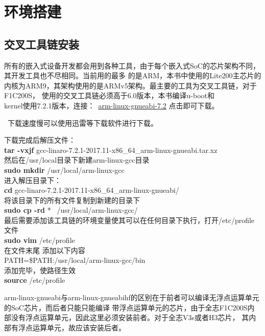 \section{环境搭建}
\subsection{交叉工具链安装}
所有的嵌入式设备开发都会用到各种工具，由于每个嵌入式SoC的芯片架构不同，其开发工具也不尽相同。当前用的最多
的是ARM，本书中使用的Lite200主芯片的内核为ARM9，其架构使用的是ARMv5架构。最主要的工具为交叉工具链，对于F1C200S，
使用的交叉工具链必须高于6.0版本，本书编译u-boot和\\
kernel使用7.2.1版本，连接：\faChain \ 
\href{https://releases.linaro.org/components/toolchain/binaries/7.2-2017.11/arm-linux-gnueabi/gcc-linaro-7.2.1-2017.11-x86_64_arm-linux-gnueabi.tar.xz}{arm-linux-gnueabi-7.2}
\quad 点击即可下载。
\begin{tcolorbox}[colback=red!5!white,colframe=red!75!black]
	\faBellO \ 下载速度慢可以使用迅雷等下载软件进行下载。
\end{tcolorbox}
\noindent
下载完成后解压文件：\\
\textbf{tar -vxjf } gcc-linaro-7.2.1-2017.11-x86\_64\_arm-linux-gnueabi.tar.xz \\
然后在/usr/local目录下新建arm-linux-gcc目录 \\
\textbf{sudo mkdir } /usr/local/arm-linux-gcc \\
进入解压目录下：\\
\textbf{cd  } gcc-linaro-7.2.1-2017.11-x86\_64\_arm-linux-gnueabi/ \\
将该目录下的所有文件复制到新建的目录下 \\
\textbf{sudo cp -rd}  *  \  /usr/local/arm-linux-gcc/ \\
最后需要添加该工具链的环境变量使其可以在任何目录下执行，打开/etc/profile文件\\
\textbf{sudo vim }  /etc/profile  \\
在文件末尾 添加以下内容\\
PATH=\$PATH:/usr/local/arm-linux-gcc/bin \\
添加完毕，使路径生效 \\
\textbf{source }  /etc/profile  

\begin{note}
arm-linux-gnueabi与arm-linux-gnueabihf的区别在于前者可以编译无浮点运算单元的SoC芯片，而后者只能只能编译
带浮点运算单元的芯片，由于全志F1C200S内部没有浮点运算单元，因此这里必须安装前者。对于全志V3s或者H3芯片，
其内部有浮点运算单元，故应该安装后者。
\end{note}

